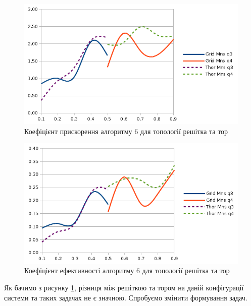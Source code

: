 \begin{figure}[h]
  \begin{center}
    \includegraphics[width=\textwidth]{res/grid_thor.png}
  \end{center}
  \caption{Коефіцієнт прискорення алгоритму 6 для топології решітка та тор}
\label{fig:grid_thor}
\end{figure}

\begin{figure}[h]
  \begin{center}
    \includegraphics[width=\textwidth]{res/grid_thor_eff.png}
  \end{center}
  \caption{Коефіцієнт ефективності алгоритму 6 для топології решітка та тор}
\label{fig:grid_thor_eff}
\end{figure}


Як бачимо з рисунку \ref{fig:grid_thor}, різниця між решіткою та тором на даній конфігурації системи та таких задачах не є значною. Спробуємо змінити формування задач.

